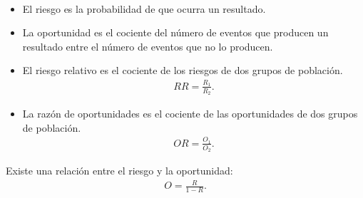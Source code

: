 \begin{defi} \
    \begin{itemize}
        \item El riesgo es la probabilidad de que ocurra un resultado.
        \item La oportunidad es el cociente del número de eventos que producen un resultado entre el número de eventos que no lo producen.
        \item  El riesgo relativo es el cociente de los riesgos de dos grupos de población.
              \begin{align*}
                  RR = \frac{R_1}{R_2}.
              \end{align*}
        \item La razón de oportunidades es el cociente de las oportunidades de dos grupos de población.
              \begin{align*}
                  OR = \frac{O_1}{O_2}.
              \end{align*}
    \end{itemize}
\end{defi}

\begin{obs}
    Existe una relación entre el riesgo y la oportunidad:
    \begin{align*}
        O = \frac{R}{1-R}.
    \end{align*}
\end{obs}

